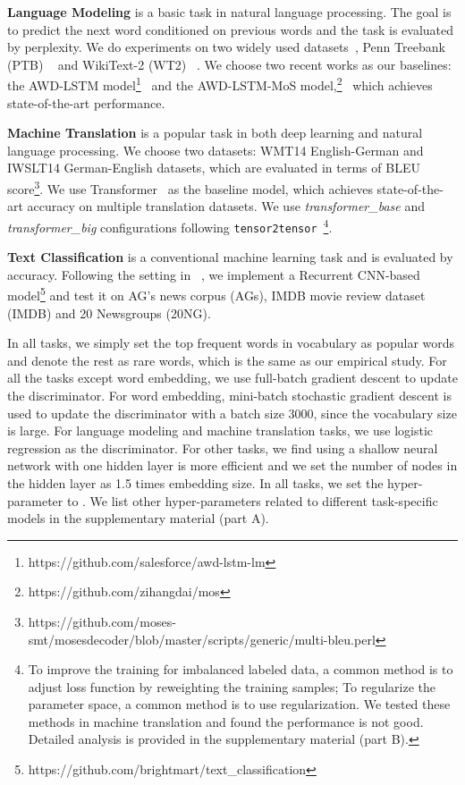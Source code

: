 \documentclass{article}
\begin{document}
\textbf{Language Modeling} is a basic task in natural language processing. The goal is to predict the next word conditioned on previous words and the task is evaluated by perplexity. We do experiments on two widely used datasets~\cite{DBLP:journals/corr/abs-1708-02182,DBLP:journals/corr/MerityXBS16,DBLP:journals/corr/abs-1711-03953}, Penn Treebank (PTB) ~\cite{DBLP:conf/interspeech/MikolovKBCK10} and WikiText-2 (WT2) ~\cite{DBLP:journals/corr/MerityXBS16}. We choose two recent works as our baselines: the AWD-LSTM model\footnote{https://github.com/salesforce/awd-lstm-lm}~\cite{DBLP:journals/corr/abs-1708-02182} and the AWD-LSTM-MoS model,\footnote{https://github.com/zihangdai/mos}~\cite{DBLP:journals/corr/abs-1711-03953} which achieves state-of-the-art performance.

\textbf{Machine Translation} is a popular task in both deep learning and natural language processing. We choose two datasets: WMT14 English-German and IWSLT14 German-English datasets, which are evaluated in terms of BLEU score\footnote{https://github.com/moses-smt/mosesdecoder/blob/master/scripts/generic/multi-bleu.perl}. We use Transformer~\cite{vaswani2017attention} as the baseline model, which achieves state-of-the-art accuracy on multiple translation datasets. We use \emph{transformer\_base} and \emph{transformer\_big} configurations following \texttt{tensor2tensor}~\cite{DBLP:journals/corr/abs-1803-07416}\footnote{To improve the training for imbalanced labeled data, a common method is to adjust loss function by reweighting the training samples; To regularize the parameter space, a common method is to use  regularization. We tested these methods in machine translation and found the performance is not good. Detailed analysis is provided in the supplementary material (part B).}.

\textbf{Text Classification} is a conventional machine learning task and is evaluated by accuracy. Following the setting in ~\cite{lai2015recurrent}, we implement a Recurrent CNN-based model\footnote{https://github.com/brightmart/text\_classification} and test it on AG's news corpus (AGs), IMDB movie review dataset (IMDB) and 20 Newsgroups (20NG). 

In all tasks, we simply set the top  frequent words in vocabulary as popular words and denote the rest as rare words, which is the same as our empirical study. For all the tasks except word embedding, we use full-batch gradient descent to update the discriminator. For word embedding, mini-batch stochastic gradient descent is used to update the discriminator with a batch size 3000, since the vocabulary size is large. For language modeling and machine translation tasks, we use logistic regression as the discriminator. For other tasks, we find using a shallow neural network with one hidden layer is more efficient and we set the number of nodes in the hidden layer as 1.5 times embedding size. In all tasks, we set the hyper-parameter  to . We list other hyper-parameters related to different task-specific models in the supplementary material (part A).
\end{document}
